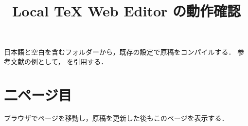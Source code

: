 \documentclass[uplatex,dvipdfmx]{jsarticle}
\title{Local TeX Web Editor の動作確認}
\author{}
\date{}
\begin{document}
\maketitle

日本語と空白を含むフォルダーから，既存の設定で原稿をコンパイルする．
参考文献の例として，\citep{sample2026} を引用する．

\newpage
\section{二ページ目}
ブラウザでページを移動し，原稿を更新した後もこのページを表示する．





\end{document}
